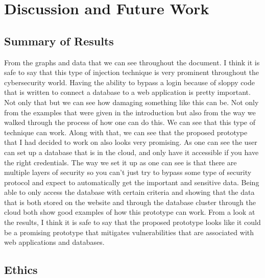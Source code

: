 \chapter{Discussion and Future Work}
\label{ch:conclusion}

\section{Summary of Results}

From the graphs and data that we can see throughout the document. I think it is
safe to say that this type of injection technique is very prominent throughout
the cybersecurity world. Having the ability to bypass a login because of sloppy code
that is written to connect a database to a web application is pretty important. Not
only that but we can see how damaging something like this can be. Not only from the examples
that were given in the introduction but also from the way we walked through the
process of how one can do this. We can see that this type of technique can
work. Along with that, we can see that the proposed prototype that I had decided to
work on also looks very promising. As one can see the user can set up a
database that is in the cloud, and only have it accessible if you have the right credentials. The
way we set it up as one can see is that there are multiple layers of security so you can't
just try to bypass some type of security protocol and expect to automatically get the
important and sensitive data. Being able to only access the database with certain
criteria and showing that the data that is both stored on the website and through the
database cluster through the cloud both show good examples of how this prototype can work.
From a look at the results, I think it is safe to say that the proposed prototype
looks like it could be a promising prototype that mitigates vulnerabilities that are associated
with web applications and databases.

\section{Ethics}

